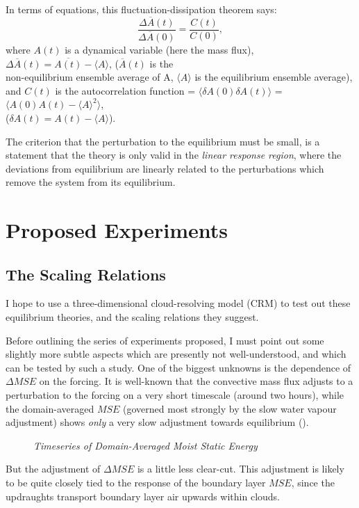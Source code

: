 \documentclass[11pt,a4paper]{article}
\begin{document}
In terms of equations, this fluctuation-dissipation theorem says:
\begin{equation}
\frac{\Delta \overline{A}(t)}{\Delta \overline{A}(0)} = \frac{C(t)}{C(0)},
\end{equation}
where $A(t)$ is a dynamical variable (here the mass flux), $\Delta
\overline{A}(t) = \overline{A(t)}-\langle A \rangle$,
($\overline{A}(t)$ is the\\
 non-equilibrium ensemble average of
A, $\langle A \rangle$ is the equilibrium ensemble average), \\
and $C(t)$ is the autocorrelation function =  $\langle \delta A(0) \delta A(t) \rangle$ = $\langle A(0)A(t) -
\langle A \rangle ^2 \rangle$, \\
($\delta A(t)=A(t)-\langle A \rangle$).

The criterion that the perturbation to the equilibrium must be small,
is a statement that the theory is only valid in the \textit{linear
response region}, where the deviations from equilibrium are linearly
related to the perturbations which remove the system from its
equilibrium.
\section{Proposed Experiments}
\subsection{The Scaling Relations}
I hope to use a three-dimensional cloud-resolving model (CRM) to test
out these equilibrium theories, and the scaling relations they
suggest. 

Before outlining the series of experiments proposed, I must point out some slightly more subtle aspects which are
presently not well-understood, and which can be tested by such
a study. One of the biggest unknowns is the dependence of $\Delta
MSE$ on the forcing. It is well-known that the convective mass flux
adjusts to a perturbation to the forcing on a very short timescale
(around two hours), while the domain-averaged $MSE$ (governed most
strongly by the slow water vapour adjustment) shows \textit{only} a
very slow adjustment towards equilibrium (\mbox{\cite{adrian}}).\\
\begin{figure}[ht!!]
\center
\mbox{}
\caption{\it{Timeseries of Domain-Averaged Moist Static Energy}}
\end{figure}
 But the adjustment of
$\Delta MSE$ is a little less clear-cut. This adjustment is likely to
be quite closely tied to the response of the boundary layer $MSE$,
since the updraughts transport boundary layer air upwards within clouds.
\end{document}
